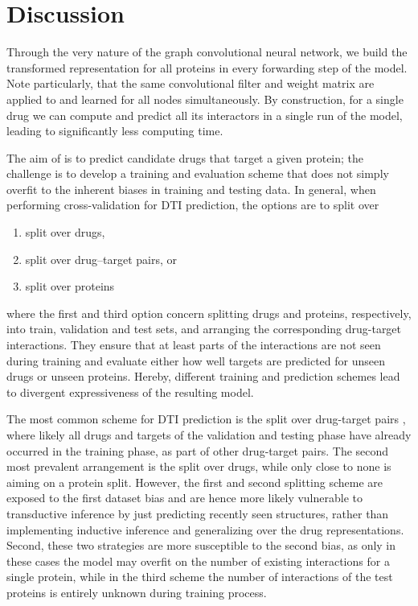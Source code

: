 \documentclass{bioinfo}
\begin{document}
\section{Discussion}


Through the very nature of the graph convolutional neural network, we
build the transformed representation for all proteins in every
forwarding step of the model. Note particularly, that the same
convolutional filter and weight matrix are applied to and learned for
all nodes simultaneously. By construction, for a single drug we can
compute and predict all its interactors in a single run of the model,
leading to significantly less computing time.




The aim of \name is to predict candidate drugs that target a given
protein; the challenge is to develop a training and evaluation scheme
that does not simply overfit to the inherent biases in training and
testing data.
In general, when performing cross-validation for DTI prediction, the
options are to split over 
\begin{enumerate}
	\item split over drugs,
	\item split over drug--target pairs, or
	\item split over proteins
\end{enumerate}
where the first and third option concern splitting drugs and proteins,
respectively, into train, validation and test sets, and arranging the
corresponding drug-target interactions. They ensure that at least
parts of the interactions are not seen during training and evaluate
either how well targets are predicted for unseen drugs or unseen
proteins. Hereby, different training and prediction schemes lead to
divergent expressiveness of the resulting model.

 The most common scheme for DTI
prediction is the split over drug-target pairs \citep{Survey2018},
where likely all drugs and targets of the validation and testing phase
have already occurred in the training phase, as part of other
drug-target pairs. The second most prevalent arrangement is the split
over drugs, while only close to none is aiming on a protein split.
However, the first and second splitting scheme are exposed to the
first dataset bias and are hence more likely vulnerable to
transductive inference by just predicting recently seen structures,
rather than implementing inductive inference and generalizing over the
drug representations. Second, these two strategies are more
susceptible to the second bias, as only in these cases the model may
overfit on the number of existing interactions for a single protein,
while in the third scheme the number of interactions of the test
proteins is entirely unknown during training process.
\end{document}
